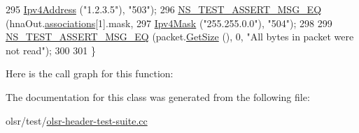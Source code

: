 \begin{DoxyCode}
295                          \hyperlink{classns3_1_1Ipv4Address}{Ipv4Address} (\textcolor{stringliteral}{"1.2.3.5"}), \textcolor{stringliteral}{"503"});
296   \hyperlink{group__testing_ga2a9d78cffb3db8e867c35fff0b698cf5}{NS\_TEST\_ASSERT\_MSG\_EQ} (hnaOut.\hyperlink{structns3_1_1olsr_1_1MessageHeader_1_1Hna_a3989e2a5026258e7cbde6d7795aa9c9f}{associations}[1].mask,
297                          \hyperlink{classns3_1_1Ipv4Mask}{Ipv4Mask} (\textcolor{stringliteral}{"255.255.0.0"}), \textcolor{stringliteral}{"504"});
298 
299   \hyperlink{group__testing_ga2a9d78cffb3db8e867c35fff0b698cf5}{NS\_TEST\_ASSERT\_MSG\_EQ} (packet.\hyperlink{classns3_1_1Packet_a462855c9929954d4301a4edfe55f4f1c}{GetSize} (), 0, \textcolor{stringliteral}{"All bytes in packet were not
       read"});
300 
301 \}
\end{DoxyCode}


Here is the call graph for this function\+:




The documentation for this class was generated from the following file\+:\begin{DoxyCompactItemize}
\item 
olsr/test/\hyperlink{olsr-header-test-suite_8cc}{olsr-\/header-\/test-\/suite.\+cc}\end{DoxyCompactItemize}
